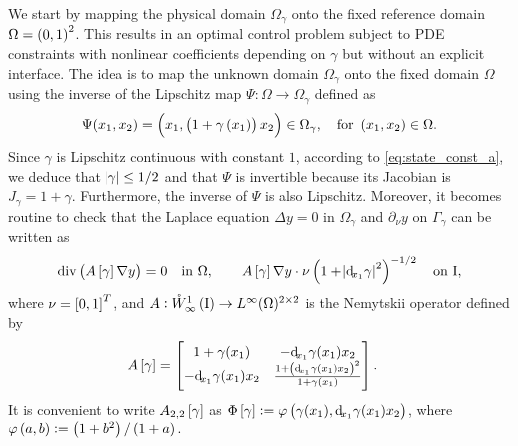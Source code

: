 \documentclass[final]{siamltex}
\begin{document}
We start by mapping the physical domain $\Omega_{\gamma}$ onto the fixed reference domain 
$\Omega=\intoo{0,1}^2$. 
This results in an optimal control problem subject to PDE constraints with nonlinear coefficients depending on $\gamma$ but without an explicit interface. 
The idea is to map the unknown domain ${{\Omega_\gamma}}$ onto the fixed domain
$\Omega$ using the inverse of the Lipschitz map $\Psi :
\Omega \to {{\Omega_\gamma}}$ defined as
	\begin{align}\label{eq:ref_dom_map}
		\Psi(x_1,x_2) = \del{x_1, \del{1+\gamma\del{x_1}} x_2} \in
		{{\Omega_\gamma}}, \quad {{\textnormal{{for }}}} \del{x_1,x_2} \in \Omega.
	\end{align}							
Since $\gamma$ is Lipschitz continuous with constant $1$, according to 
\eqref{eq:state_const_a}, we deduce that $\abs{\gamma} \leq 1/2$ and
that $\Psi$ is invertible because its Jacobian is $J_\gamma=1+\gamma$. Furthermore, the inverse of $\Psi$ is also Lipschitz. Moreover, it becomes routine to check that the Laplace equation $\Delta y = 0$ in ${{\Omega_\gamma}}$ and ${{\partial_{\nu}}} y$ on $\Gamma_\gamma$ can be written as
$$
   \operatorname{div}{\del{{A\sbr{\gamma}{\nabla} y}}} = 0 \quad \mbox{in } \Omega, \qquad
    A\sbr{\gamma}{\nabla} y \cdot \nu \del{1+\abs{{\operatorname{d}\!}_{x_1}\gamma}^2}^{-1/2} \quad \mbox{on } {\text{\rm I}},
$$
where $\nu = \sbr{0,1}^{T}$, and $A : {{\mathring{W}^{{1}}_{{\infty}}\del{{\text{\rm I}}}}} \rightarrow 
L^\infty(\Omega)^{2\times 2}$ is the Nemytskii operator \cite[Chapter 4]{FTroltzsch_2010a} defined by
\begin{align} \label{eq:op_A}
	A\sbr{\gamma} &
				  = \begin{bmatrix} 1+\gamma(x_1) & -{\operatorname{d}\!}_{x_1}\gamma(x_1)x_2 \\ 				
				  			  -{\operatorname{d}\!}_{x_1}\gamma(x_1)x_2 & \frac{1+\del{{\operatorname{d}\!}_{x_1}\gamma(x_1)x_2}^2}{1+\gamma(x_1)} \end{bmatrix} .
\end{align} 
It is convenient to write $A_{2,2}\sbr{\gamma}$ as $\Phi\sbr{\gamma} := \varphi\del{\gamma(x_1), {\operatorname{d}\!}_{x_1}\gamma(x_1)x_2}$, where $\varphi\del{a, b} := \del{1 + b^2}/\del{1 + a}.$
 
\end{document}
